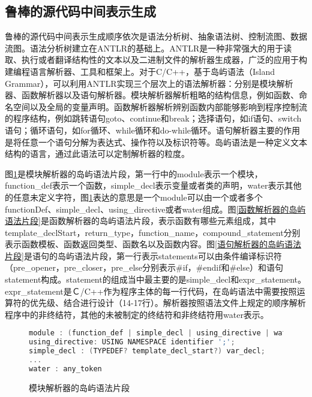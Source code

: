 \subsection{鲁棒的源代码中间表示生成}
\label{源代码的鲁棒分析}
鲁棒的源代码中间表示生成顺序依次是语法分析树、抽象语法树、控制流图、数据流图。语法分析树建立在ANTLR的基础上。ANTLR是一种非常强大的用于读取、执行或者翻译结构性的文本以及二进制文件的解析器生成器，广泛的应用于构建编程语言解析器、工具和框架上。对于C/C++，基于岛屿语法{（Island Grammar）}，可以利用ANTLR实现三个层次上的语法解析器：分别是模块解析器、函数解析器以及语句解析器。模块解析器解析粗略的结构信息，例如函数、命名空间以及全局的变量声明。函数解析器解析辨别函数内部能够影响到程序控制流的程序结构，例如跳转语句goto、continue和break；选择语句，如if语句、switch语句；循环语句，如for循环、while循环和do-while循环。语句解析器主要的作用是将任意一个语句分解为表达式、操作符以及标识符等。岛屿语法是一种定义文本结构的语言，通过此语法可以定制解析器的粒度。

图\ref{模块解析器的岛屿语法片段}是模块解析器的岛屿语法片段，第一行中的module表示一个模块，function\_def表示一个函数，simple\_decl表示变量或者类的声明，water表示其他的任意未定义字符，图\ref{模块解析器的岛屿语法片段}表达的意思是一个module可以由一个或者多个functionDef、simple\_decl、using\_directive或者water组成。图\ref{函数解析器的岛屿语法片段}是函数解析器的岛屿语法片段，表示函数有哪些元素组成，其中template\_declStart，return\_type，function\_name，compound\_statement分别表示函数模板、函数返回类型、函数名以及函数内容。图\ref{语句解析器的岛屿语法片段}是语句的岛屿语法片段，第一行表示statements可以由条件编译标识符{（pre\_opener，pre\_closer，pre\_else分别表示\#if，\#endif和\#else）}和语句statement构成。statement的组成当中最主要的是simple\_decl和expr\_statement。expr\_statement是Ｃ/C++作为程序主体的每一行代码，在岛屿语法中需要按照运算符的优先级、结合进行设计{（14-17行）}。解析器按照语法文件上规定的顺序解析程序中的非终结符，其他的未被制定的终结符和非终结符用water表示。

\begin{figure}[h]
\begin{lstlisting}[language=C]
module : (function_def | simple_decl | using_directive | water)*;
using_directive: USING NAMESPACE identifier ';';
simple_decl : (TYPEDEF? template_decl_start?) var_decl;
...
water : any_token
\end{lstlisting}
\caption{模块解析器的岛屿语法片段}
\label{模块解析器的岛屿语法片段}
\end{figure}

